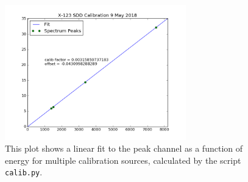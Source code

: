 \begin{figure}
  \centering
  \includegraphics[width=0.7\textwidth]{linfit.png}
  \caption{\label{fig:linfit} This plot shows a linear fit to the peak channel
    as a function of energy for multiple calibration sources, calculated by the
    script \texttt{calib.py}. }
\end{figure}



